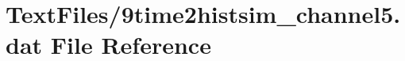 \hypertarget{9time2histsim__channel5_8dat}{}\section{Text\+Files/9time2histsim\+\_\+channel5.dat File Reference}
\label{9time2histsim__channel5_8dat}
